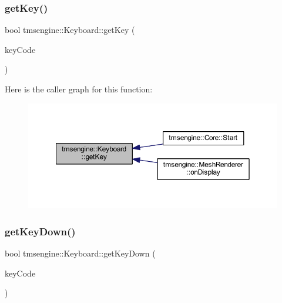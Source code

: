 \subsubsection{\texorpdfstring{get\+Key()}{getKey()}}
{\footnotesize\ttfamily bool tmsengine\+::\+Keyboard\+::get\+Key (\begin{DoxyParamCaption}\item[{S\+D\+L\+\_\+\+Scancode}]{key\+Code }\end{DoxyParamCaption})}

Here is the caller graph for this function\+:\nopagebreak
\begin{figure}[H]
\begin{center}
\leavevmode
\includegraphics[width=350pt]{classtmsengine_1_1_keyboard_ab7baeae12cffe8f588fdf5a1227f09ba_icgraph}
\end{center}
\end{figure}
\mbox{\label{classtmsengine_1_1_keyboard_a41ea249e18f2422a1de274dd51df0e8c}} 
\subsubsection{\texorpdfstring{get\+Key\+Down()}{getKeyDown()}}
{\footnotesize\ttfamily bool tmsengine\+::\+Keyboard\+::get\+Key\+Down (\begin{DoxyParamCaption}\item[{S\+D\+L\+\_\+\+Scancode}]{key\+Code }\end{DoxyParamCaption})}

\mbox{\label{classtmsengine_1_1_keyboard_a9de47cf02ce1c2c7c1652ac94ea19f5b}} 
